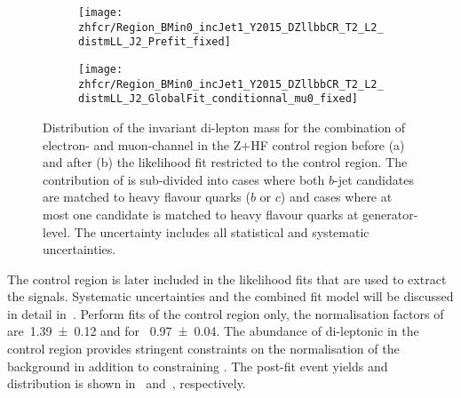 \begin{figure}[htbp]
  \centering


  \begin{subfigure}{.485\textwidth}
    \texttt{[image: zhfcr/Region\_BMin0\_incJet1\_Y2015\_DZllbbCR\_T2\_L2\_distmLL\_J2\_Prefit\_fixed]}
    \label{fig:zcr_mll_prefit}
  \end{subfigure}\hfill%
  \begin{subfigure}{.485\textwidth}
    \texttt{[image: zhfcr/Region\_BMin0\_incJet1\_Y2015\_DZllbbCR\_T2\_L2\_distmLL\_J2\_GlobalFit\_conditionnal\_mu0\_fixed]}
    \label{fig:zcr_mll_postfit}
  \end{subfigure}

  \caption{Distribution of the invariant di-lepton mass for the
    combination of electron- and muon-channel in the Z+HF control
    region before (a) and after (b) the likelihood fit restricted to
    the control region. The contribution of \Zjets is sub-divided into
    cases where both $b$-jet candidates are matched to heavy flavour
    quarks ($b$ or $c$) and cases where at most one candidate is
    matched to heavy flavour quarks at generator-level. The
    uncertainty includes all statistical and systematic
    uncertainties.}
\end{figure}

The \ZHF control region is later included in the likelihood fits that
are used to extract the \HH signals. Systematic uncertainties and the
combined fit model will be discussed in detail
in~. Perform fits of
the control region only, the normalisation factors of \ZHF
are~\num{1.39 \pm 0.12} and for \ttbar~\num{0.97 \pm 0.04}. The
abundance of di-leptonic \ttbar in the control region provides
stringent constraints on the normalisation of the \ttbar background in
addition to constraining \ZHF. The post-fit event yields and \mll
distribution is shown in~
and~, respectively.


